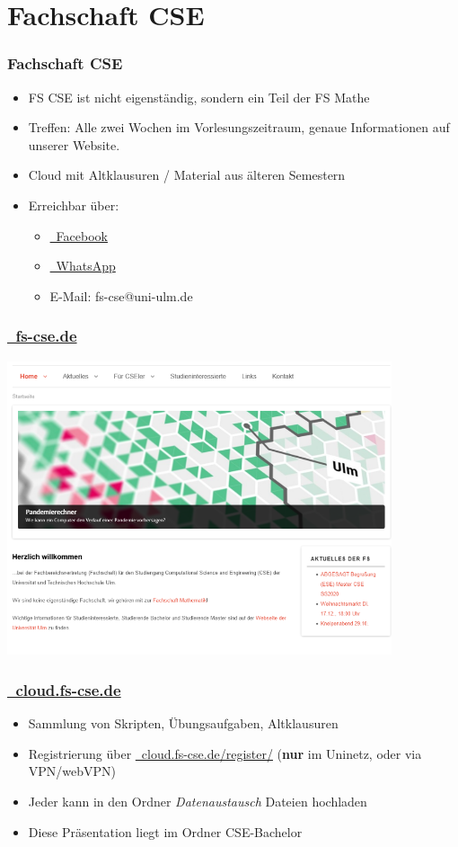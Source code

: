 \documentclass[10pt,a4paper]{beamer}
\begin{document}
\section{Fachschaft CSE}
\begin{frame}
\frametitle{Fachschaft CSE}
\begin{itemize}
	\setlength{\itemsep}{10pt} %
	\item FS CSE ist nicht eigenständig, sondern ein Teil der FS Mathe
	\item Treffen: Alle zwei Wochen im Vorlesungszeitraum, genaue Informationen auf unserer Website.
	\item Cloud mit Altklausuren / Material aus älteren Semestern
	\item Erreichbar über:
	\begin{itemize}
		\item \href{https://www.facebook.com/groups/356850697732243/}{\Mundus~Facebook}
		\item \href{https://chat.whatsapp.com/CQYUbnH2UGZLXuFFrI0VxO}{\Mundus~WhatsApp}
		\item E-Mail: fs-cse@uni-ulm.de
	\end{itemize}
\end{itemize}	
\end{frame}

\begin{frame}
\frametitle{ \href{http://fs-cse.de}{\Mundus~fs-cse.de}}
\begin{center}
\includegraphics[width=0.85\textwidth]{website.png}
\end{center}
\end{frame}
\begin{frame}
\frametitle{\href{http://cloud.fs-cse.de}{\Mundus~cloud.fs-cse.de} }
\begin{itemize}
		\setlength{\itemsep}{10pt} %
		\item Sammlung von Skripten, Übungsaufgaben, Altklausuren
		\item Registrierung über \href{http://cloud.fs-cse.de/register/}{\Mundus~cloud.fs-cse.de/register/} (\textbf{nur} im Uninetz, oder via VPN/webVPN)
		\item Jeder kann in den Ordner \emph{Datenaustausch} Dateien hochladen
		\item Diese Präsentation liegt im Ordner CSE-Bachelor
	\end{itemize}
\end{frame}
\end{document}
